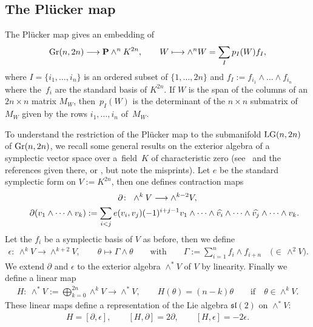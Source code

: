 \documentclass[10pt,a4paper]{amsart}
\newcommand{\PP}{{\bf P}}
\numberwithin{equation}{section}
\begin{document}
\subsection{The Pl\"ucker map}\label{pluc}
The Pl\"ucker map gives an embedding of
\begin{gather*}
{\rm Gr}(n,2n) \longrightarrow \PP \wedge^n K^{2n}, \qquad W \longmapsto \wedge^nW = \sum_I p_I(W)f_I,
\end{gather*}
where $I=\{i_1,\ldots,i_n\}$ is an ordered subset of $\{1,\ldots,2n\}$ and $f_I:=f_{i_1}\wedge\dots\wedge f_{i_n}$ where the~$f_i$ are the standard basis of $K^{2n}$. If $W$ is the span of the columns of an $2n\times n$ matrix $M_W$, then~$p_I(W)$ is the determinant of the $n\times n$ submatrix of~$M_W$ given by the rows $i_1,\ldots,i_n$ of~$M_W$.

To understand the restriction of the Pl\"ucker map to the submanifold ${\rm LG}(n,2n)$ of ${\rm Gr}(n,2n)$, we recall some general results on the exterior algebra of a symplectic vector space over a~field~$K$ of characteristic zero (see~\cite{Gow} and the references given there, or \cite[Section~11.6.7]{P}, but note the misprints). Let $e$ be the standard symplectic form on $V:=K^{2n}$, then one defines contraction maps
\begin{gather*}
\partial\colon \ \wedge^kV \longrightarrow \wedge^{k-2} V,\\
\hphantom{\partial\colon}{} \ \partial(v_1\wedge\cdots\wedge v_k) := \sum_{i<j}e(v_i,v_j)(-1)^{i+j-1}
v_1\wedge\cdots\wedge \widehat{v_i}\wedge\cdots\wedge\widehat{v_j}\wedge\cdots\wedge v_k.
\end{gather*}
Let the $f_i$ be a symplectic basis of $V$ as before, then we define
\begin{gather*}
\epsilon\colon \ \wedge^k V \longrightarrow \wedge^{k+2}V,\qquad \theta\longmapsto \Gamma\wedge\theta
\qquad\text{with}\qquad \Gamma := \sum_{i=1}^nf_i\wedge f_{i+n}\quad\big({\in}\, \wedge^2 V\big).
\end{gather*}
We extend $\partial$ and $\epsilon$ to the exterior algebra $\wedge^*V$ of $V$ by linearity. Finally we define a linear map
\begin{gather*}
H\colon \ \wedge^*V := \bigoplus_{k=0}^{2n}\wedge^kV \longrightarrow \wedge^*V,\qquad
H(\theta) = (n-k)\theta\qquad\text{if}\quad\theta\in\wedge^kV.
\end{gather*}
These linear maps define a representation of the Lie algebra ${\mathfrak{sl}}(2)$ on $\wedge^*V$:
\begin{gather*}
H = [\partial,\epsilon],\qquad [H,\partial] = 2\partial,\qquad [H,\epsilon]=-2\epsilon.
\end{gather*}
\end{document}

